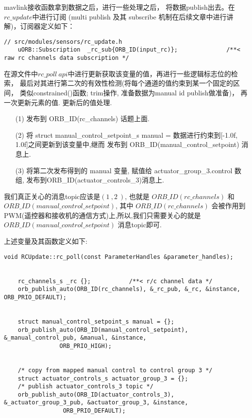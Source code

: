 mavlink接收函数拿到数据之后，进行一些处理之后， 将数据publish出去。在$rc\_update$中进行订阅
(multi publish 及其 subscribe 机制在后续文章中进行讲解)，订阅器定义如下：
\begin{lstlisting}[title=订阅器的声明定义]
    // src/modules/sensors/rc_update.h
    uORB::Subscription	_rc_sub{ORB_ID(input_rc)};				/**< raw rc channels data subscription */
\end{lstlisting}

在源文件中$rc\_poll\ api$中进行更新获取该变量的值，再进行一些逻辑标志位的检索，
最后对其进行第二次的有效性检测(将每个通道的值约束到某一个固定的区间， 类似constrained()函数; trim操作, 
准备数据为manual id publish做准备)， 再一次更新元素的值. 更新后的值处理.
\begin{itemize}
    \item [(1)] 发布到 ORB\_ID(rc\_channels) 话题上面.
    \item [(2)] 将 struct manual\_control\_setpoint\_s manual = {} 数据进行约束到[-1.0f, 1.0f]之间更新到该变量中,继而 发布到 ORB\_ID(manual\_control\_setpoint) 消息上.
    \item [(3)] 将第二次发布得到的 manual 变量, 赋值给 actuator\_group\_3.control 数组, 发布到ORB\_ID(actuator\_controls\_3)消息上.
\end{itemize}

我们真正关心的消息topic应该是$(1\>, 2\>)$, 也就是 $ORB\_ID(rc\_channels)$ 和 $ORB\_ID(manual\_control\_setpoint)$, 
其中 $ORB\_ID(rc\_channels)$ 会被作用到PWM(遥控器和接收机的通信方式)上,所以,我们只需要关心的就是 $ORB\_ID(manual\_control\_setpoint)$ 消息topic即可.
\par
上述变量及其函数定义如下:
\begin{lstlisting}[title=上述变量及其函数定义]
    void RCUpdate::rc_poll(const ParameterHandles &parameter_handles);


    rc_channels_s _rc {};			/**< r/c channel data */
    orb_publish_auto(ORB_ID(rc_channels), &_rc_pub, &_rc, &instance, ORB_PRIO_DEFAULT);
    
    
    struct manual_control_setpoint_s manual = {};
    orb_publish_auto(ORB_ID(manual_control_setpoint), &_manual_control_pub, &manual, &instance,
                ORB_PRIO_HIGH);
    
    
    /* copy from mapped manual control to control group 3 */
    struct actuator_controls_s actuator_group_3 = {};
    /* publish actuator_controls_3 topic */
    orb_publish_auto(ORB_ID(actuator_controls_3), &_actuator_group_3_pub, &actuator_group_3, &instance,
                 ORB_PRIO_DEFAULT);
\end{lstlisting}


